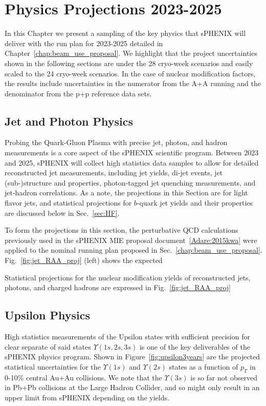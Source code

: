 \chapter{Physics Projections 2023-2025}
\label{chap:physics_projections}

In this Chapter we present a sampling of the key physics that sPHENIX will deliver with the run plan for 2023-2025 detailed in Chapter~\ref{chap:beam_use_proposal}.    We highlight that the project uncertainties shown in the following sections are under the 28 cryo-week scenarios and easily scaled to the 24 cryo-week scenarios.  In the case of nuclear modification factors, the results include uncertainties in the numerator from the A+A running and the denominator from the p+p reference data sets.

\section{Jet and Photon Physics}
\label{sec:jet}

Probing the Quark-Gluon Plasma with precise jet, photon, and hadron measurements is a core aspect of the sPHENIX scientific program. Between 2023 and 2025, sPHENIX will collect high statistics data samples to allow for detailed reconstructed jet measurements, including jet yields, di-jet events, jet (sub-)structure and properties, photon-tagged jet quenching measurements, and jet-hadron correlations. As a note, the projections in this Section are for light flavor jets, and statistical projections for $b$-quark jet yields and their properties are discussed below in Sec.~\ref{sec:HF}. 

To form the projections in this section, the perturbative QCD calculations previously used in the sPHENIX MIE proposal document~\ref{Adare:2015kwa} were applied to the nominal running plan proposed in Sec.~\ref{chap:beam_use_proposal}. Fig.~\ref{fig:jet_RAA_proj} (left) shows the expected 

Statistical projections for the nuclear modification  yields of reconstructed jets, photons, and charged hadrons are expressed in Fig.~\ref{fig:jet_RAA_proj} 

\section{Upsilon Physics}
\label{sec:upsilon}

High statistics measurements of the Upsilon states with sufficient precision for clear separate of said states $\Upsilon(1s,2s,3s)$ is one of the key deliverables of the sPHENIX physics program.  Shown in Figure~\ref{fig:upsilon3years} are the projected statistical uncertainties for the $\Upsilon(1s)$ and $\Upsilon(2s)$ states as a function of $p_{T}$ in 0-10\% central Au+Au collisions.   We note that the $\Upsilon(3s)$ is so far not observed in Pb+Pb collisions at the Large Hadron Collider, and so might only result in an upper limit from sPHENIX depending on the yields.   


